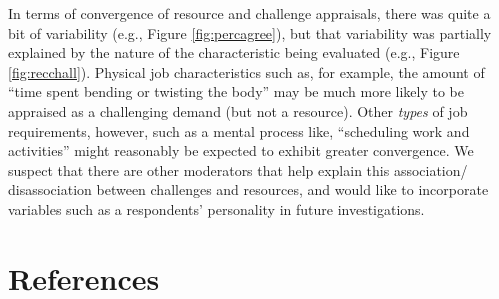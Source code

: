 \documentclass[
  man]{apa6}
\begin{document}
In terms of convergence of resource and challenge appraisals, there was quite a bit of variability (e.g., Figure \ref{fig:percagree}), but that variability was partially explained by the nature of the characteristic being evaluated (e.g., Figure \ref{fig:recchall}). Physical job characteristics such as, for example, the amount of ``time spent bending or twisting the body'' may be much more likely to be appraised as a challenging demand (but not a resource). Other \emph{types} of job requirements, however, such as a mental process like, ``scheduling work and activities'' might reasonably be expected to exhibit greater convergence. We suspect that there are other moderators that help explain this association/ disassociation between challenges and resources, and would like to incorporate variables such as a respondents' personality in future investigations.

\hypertarget{references}{%
\section*{References}\label{references}}
\end{document}
